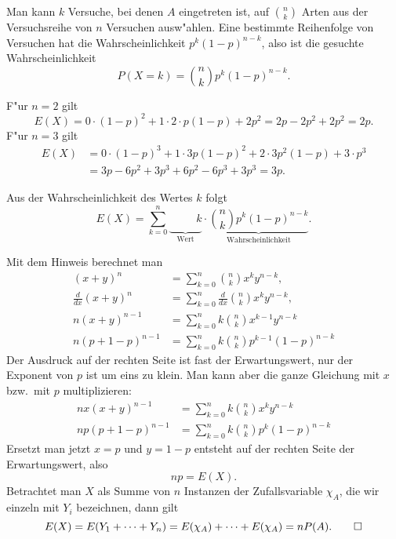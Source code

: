 \begin{loesung}
\begin{teilaufgaben}
\item
Man kann $k$ Versuche, bei denen $A$ eingetreten ist, auf
$\binom{n}{k}$ Arten aus der Versuchsreihe von $n$ Versuchen
ausw"ahlen. Eine bestimmte Reihenfolge von Versuchen hat die
Wahrscheinlichkeit $p^k(1-p)^{n-k}$, also ist die gesuchte
Wahrscheinlichkeit
\[
P(X=k)=\binom{n}{k}p^k(1-p)^{n-k}.
\]
\item
F"ur $n=2$ gilt
\[
E(X)=
0\cdot (1-p)^2+1\cdot 2\cdot p(1-p)+2p^2=2p-2p^2+2p^2=2p.
\]
F"ur $n=3$ gilt
\begin{align*}
E(X)&=0\cdot (1-p)^3+1\cdot 3p(1-p)^2+2\cdot 3p^2(1-p)+3\cdot p^3\\
&=3p-6p^2+3p^3+6p^2-6p^3+3p^3=3p.
\end{align*}
\item
Aus der Wahrscheinlichkeit des Wertes $k$ folgt
\[
E(X)=\sum_{k=0}^n\underbrace{\phantom{\binom{n}{k}}k}_{\text{Wert}}\cdot
\underbrace{\binom{n}{k}p^k(1-p)^{n-k}}_{\text{Wahrscheinlichkeit}}.
\]
\item Mit dem Hinweis berechnet man
\begin{align*}
(x+y)^n&=\sum_{k=0}^n\binom{n}{k}x^ky^{n-k},\\
\frac{d}{dx}
(x+y)^n&= \sum_{k=0}^n \frac{d}{dx} \binom{n}{k}x^ky^{n-k},\\
n(x+y)^{n-1}&=\sum_{k=0}^nk\binom{n}{k}x^{k-1}y^{n-k}\\
n(p+1-p)^{n-1}&=\sum_{k=0}^nk\binom{n}{k}p^{k-1}(1-p)^{n-k}
\end{align*}
Der Ausdruck auf der rechten Seite ist fast der Erwartungswert, nur
der Exponent von $p$ ist um eins zu klein. Man kann aber die ganze
Gleichung mit $x$ bzw.~mit $p$ multiplizieren:
\begin{align*}
nx(x+y)^{n-1}&=\sum_{k=0}^nk\binom{n}{k}x^ky^{n-k}\\
np(p+1-p)^{n-1}&=\sum_{k=0}^nk\binom{n}{k}p^k(1-p)^{n-k}
\end{align*}
Ersetzt man jetzt $x=p$ und $y=1-p$
entsteht auf der rechten
Seite der Erwartungswert, also
\[
np=E(X).
\]
Betrachtet man $X$ als Summe von $n$ Instanzen der Zufallsvariable
$\chi_A$, die wir einzeln mit $Y_i$ bezeichnen, dann gilt
\[
E(X)=E(Y_1+\dots+Y_n)=E(\chi_A)+\dots +E(\chi_A)=nP(A).
\qedhere
\]
\end{teilaufgaben}
\end{loesung}


